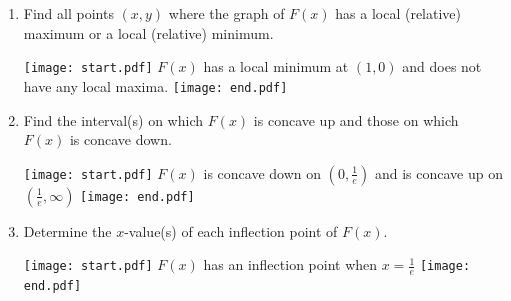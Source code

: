 \documentclass[12pt]{article}
\begin{document}
\begin{enumerate}
\begin{enumerate}
\item Find all points $(x,y)$ where the graph of $F(x)$ has a local (relative) maximum or a local (relative) minimum.

\texttt{[image: start.pdf]}
{{$F(x)$ has a local minimum at $(1,0)$ and does not have any local maxima.}}
\texttt{[image: end.pdf]}


\item Find the interval(s) on which $F(x)$ is concave up and those on which $F(x)$ is concave down.

\texttt{[image: start.pdf]}
{{$F(x)$ is concave down on $\left(0,\frac{1}{e}\right)$ and is concave up on $\left(\frac{1}{e},\infty\right)$}}
\texttt{[image: end.pdf]}


\item Determine the $x$-value(s) of each inflection point of $F(x)$.

\texttt{[image: start.pdf]}
{{$F(x)$ has an inflection point when $x=\frac{1}{e}$}}
\texttt{[image: end.pdf]}


\end{enumerate}

\end{enumerate}
\end{document}
